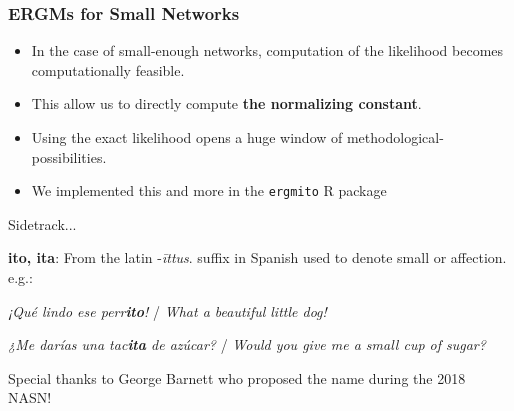 \documentclass[aspectratio=169, 9pt]{beamer}\usepackage[]{graphicx}\usepackage[]{color}
\newcommand{\ergmitopkg}[0]{\texttt{ergmito}}
\begin{document}
\begin{frame}[label=ergmito]
\frametitle{ERGMs for Small Networks}


\begin{itemize}[<+->]

\item In the case of small-enough networks, computation of the likelihood becomes
computationally feasible.

\item This allow us to directly compute {\bf\color{normconst} the normalizing constant}.\pause

\item Using the exact likelihood opens a huge window of methodological-possibilities.

\item We implemented this and more in the \ergmitopkg{} R package %
\end{itemize}


\end{frame}



\begin{frame}
Sidetrack...\vspace{.5cm}

\begin{minipage}[c]{1\linewidth}
\large \textbf{ito, ita}: From the latin -\textit{\=ittus}. suffix in Spanish used to denote small or affection. e.g.:

\hspace{.5cm} \textit{¡Qué lindo ese perr\textcolor{USCCardinal}{\textbf{ito}}!} / \textit{What a beautiful little dog!}

\hspace{.5cm} \textit{¿Me darías una tac\textcolor{USCCardinal}{\textbf{ita}} de azúcar?} / \textit{Would you give me a small cup of sugar?}
\normalsize
\end{minipage}\pause

\vfill

\alert{Special thanks to George Barnett who proposed the name during the 2018 NASN!}

\end{frame}
\end{document}
